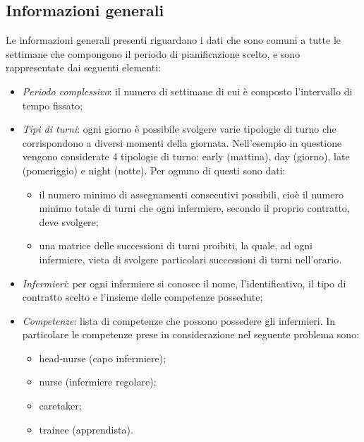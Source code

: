 \subsection{Informazioni generali}
Le informazioni generali presenti riguardano i dati che sono comuni a tutte le settimane che compongono il periodo di pianificazione scelto, e sono rappresentate dai seguenti elementi:
\begin{itemize}

\item \textit{Periodo complessivo}: il numero di settimane di cui è composto l'intervallo di tempo fissato;

\item \textit{Tipi di turni}: ogni giorno è possibile svolgere varie tipologie di turno che corrispondono a diversi momenti della giornata. Nell'esempio in questione vengono considerate 4 tipologie di turno: early (mattina), day (giorno), late (pomeriggio) e night (notte). Per ognuno di questi sono dati:
\begin{itemize}
\item il numero minimo di assegnamenti consecutivi possibili, cioè il numero minimo totale di turni che ogni infermiere, secondo il proprio contratto, deve svolgere;
\item una matrice delle successioni di turni proibiti, la quale, ad ogni infermiere, vieta di svolgere particolari successioni di turni nell'orario.
\end{itemize}

\item \textit{Infermieri}: per ogni infermiere si conosce il nome, l'identificativo, il tipo di contratto scelto e l'insieme delle competenze possedute;

\item \textit{Competenze}: lista di competenze che possono possedere gli infermieri. In particolare le competenze prese in considerazione nel seguente problema sono:
\begin{itemize}
\item head-nurse (capo infermiere);
\item nurse (infermiere regolare);
\item caretaker;
\item trainee (apprendista).
\end{itemize}


\end{itemize}
